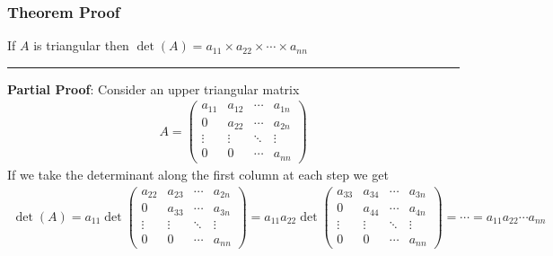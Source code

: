 \documentclass[usenames,dvipsnames,aspectratio=169,10pt]{beamer}
\numberwithin{equation}{section}
\begin{document}
\begin{frame}
\frametitle{Theorem Proof}

\begin{center} If $A$ is triangular then $\det(A)=a_{11}\times a_{22} \times \cdots \times a_{nn}$ \end{center}
\vspace{-0.5cm}\begin{center} \textcolor{airforceblue}{\rule{0.7\textwidth}{0.3mm}} \end{center}\vspace{-0.2cm}

\textbf{Partial Proof}: Consider an upper triangular matrix
\begin{align*}
A =
\begin{pmatrix}
a_{11} & a_{12} & \cdots & a_{1n} \\
0 & a_{22} & \cdots & a_{2n} \\
\vdots & \vdots & \ddots & \vdots \\
0 & 0 & \cdots & a_{nn}
\end{pmatrix}
\end{align*}
If we take the determinant along the first column at each step we get
\begin{align*}
\det(A) 
= a_{11} 
\det\begin{pmatrix}
a_{22} & a_{23} & \cdots & a_{2n} \\
0 & a_{33} & \cdots & a_{3n} \\
\vdots & \vdots & \ddots & \vdots \\
0 & 0 & \cdots & a_{nn}
\end{pmatrix} 
= a_{11}a_{22} 
\det\begin{pmatrix}
a_{33} & a_{34} & \cdots & a_{3n} \\
0 & a_{44} & \cdots & a_{4n} \\
\vdots & \vdots & \ddots & \vdots \\
0 & 0 & \cdots & a_{nn}
\end{pmatrix}
= \cdots = a_{11}a_{22} \cdots  a_{nn}
\end{align*}
\end{frame}
\end{document}
